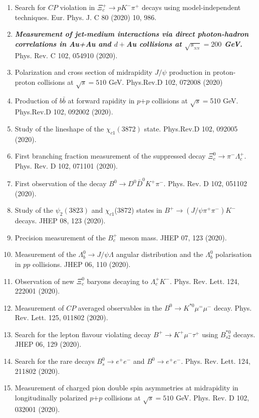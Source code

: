 \documentclass[11pt]{article}
\begin{document}
\begin{flushleft}
\begin{center}
\begin{enumerate}
		\item Search for $CP$ violation in $\Xi_c^+\rightarrow pK^-\pi^+$ decays using model-independent techniques. Eur. Phys. J. C 80 (2020) 10, 986.
		\item \textbf{\textit{Measurement of jet-medium interactions via direct photon-hadron correlations in Au+Au and $d+$Au collisions at $\sqrt{s_{_{NN}}}=200$ GeV.}} Phys. Rev. C 102, 054910 (2020).
		\item Polarization and cross section of midrapidity $J/\psi$ production in proton-proton collisions at $\sqrt{s}=510$ GeV. Phys.Rev.D 102, 072008 (2020)
		
		\item Production of $b\bar{b}$ at forward rapidity in $p$$+$$p$ collisions at $\sqrt{s}=$510 GeV. Phys.Rev.D 102, 092002 (2020).
		\item Study of the lineshape of the $\chi_{c1}(3872)$ state. Phys.Rev.D 102, 092005 (2020).
		\item First branching fraction measurement of the suppressed decay $\Xi_c^0\to \pi^-\Lambda_c^+$. Phys. Rev. D 102, 071101 (2020).
		\item First observation of the decay $B^0\rightarrow D^0\bar{D}^0K^+\pi^-$. Phys. Rev. D 102, 051102 (2020).
			\item Study of the $\psi_2(3823)$ and $\chi_{c1}$(3872) states in $B^+\to(J/\psi\pi^+\pi^-)K^-$ decays. JHEP 08, 123 (2020).
		\item Precision measurement of the $B_{c}^{+}$ meson mass. JHEP 07, 123 (2020).
			\item Measurement of the $\Lambda^0_b\rightarrow J/\psi\Lambda$ angular distribution and the $\Lambda^0_b$ polarisation in $pp$ collisions. JHEP 06, 110 (2020).
			\item Observation of new $\Xi_c^0$ baryons decaying to $\Lambda_c^+K^-$. Phys. Rev. Lett. 124, 222001 (2020).
			\item Measurement of $CP$ averaged observables in the $B^0\rightarrow K^{*0}\mu^=\mu^-$ decay. Phys. Rev. Lett. 125, 011802 (2020).
			\item Search for the lepton flavour violating decay $B^+\rightarrow K^+\mu^-\tau^+$ using $B_{s2}^{*0}$ decays. JHEP 06, 129 (2020).
		\item Search for the rare decays $B_s^0\rightarrow e^+e^-$ and $B^0\rightarrow e^+e^-$. Phys. Rev. Lett. 124, 211802 (2020).
		\item Measurement of charged pion double spin asymmetries at midrapidity in longitudinally polarized $p$$+$$p$ collisions at $\sqrt{s}=510$ GeV. Phys. Rev. D 102, 032001 (2020).

\end{enumerate}
\end{center}
\end{flushleft}
\end{document}
